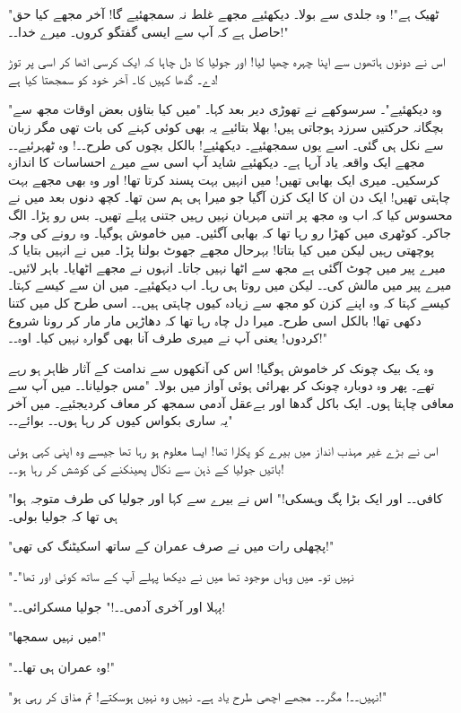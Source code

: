 "ٹھیک ہے"! وہ جلدی سے بولا۔ دیکھئیے مجھے غلط نہ سمجھئیے گا! آخر مجھے کیا حق حاصل ہے کہ آپ سے ایسی گفتگو کروں۔ میرے خدا۔۔!"

اس نے دونوں ہاتھوں سے اپنا چہرہ چھپا لیا! اور جولیا کا دل چاہا کہ ایک کرسی اٹھا کر اسی پر توڑ دے۔ گدھا کہیں کا۔ آخر خود کو سمجھتا کیا ہے!

"وہ دیکھئیے"۔ سرسوکھے نے تھوڑی دیر بعد کہا۔ "میں کیا بتاؤں بعض اوقات مجھ سے بچگانہ حرکتیں سرزد ہوجاتی ہیں! بھلا بتائیے یہ بھی کوئی کہنے کی بات تھی مگر زبان سے نکل ہی گئی۔ اسے یوں سمجھئیے۔ دیکھئیے! بالکل بچوں کی طرح۔۔! وہ ٹھہرئیے۔۔ مجھے ایک واقعہ یاد آرہا ہے۔ دیکھئیے شاید آپ اسی سے میرے احساسات کا اندازہ کرسکیں۔ میری ایک بھابی تھیں! میں انہیں بہت پسند کرتا تھا! اور وہ بھی مجھے بہت چاہتی تھیں! ایک دن ان کا ایک کزن آگیا جو میرا ہی ہم سن تھا۔ کچھ دنوں بعد میں نے محسوس کیا کہ اب وہ مجھ پر اتنی مہربان نہیں رہیں جتنی پہلے تھیں۔ بس رو پڑا۔ الگ جاکر۔ کوٹھری میں کھڑا رو رہا تھا کہ بھابی آگئیں۔ میں خاموش ہوگیا۔ وہ رونے کی وجہ پوچھتی رہیں لیکن میں کیا بتاتا! بہرحال مجھے جھوٹ بولنا پڑا۔ میں نے انہیں بتایا کہ میرے پیر میں چوٹ آگئی ہے مجھ سے اٹھا نہیں جاتا۔ انہوں نے مجھے اٹھایا۔ باہر لائیں۔ میرے پیر میں مالش کی۔۔ لیکن میں روتا ہی رہا۔ اب دیکھئیے۔ میں ان سے کیسے کہتا۔ کیسے کہتا کہ وہ اپنے کزن کو مجھ سے زیادہ کیوں چاہتی ہیں۔۔ اسی طرح کل میں کتنا دکھی تھا! بالکل اسی طرح۔ میرا دل چاہ رہا تھا کہ دھاڑیں مار مار کر رونا شروع کردوں! یعنی آپ نے میری طرف آنا بھی گوارہ نہیں کیا۔ اوہ۔۔!"

وہ یک بیک چونک کر خاموش ہوگیا! اس کی آنکھوں سے ندامت کے آثار ظاہر ہو رہے تھے۔ پھر وہ دوبارہ چونک کر بھرائی ہوئی آواز میں بولا۔ "مس جولیانا۔۔ میں آپ سے معافی چاہتا ہوں۔ ایک باکل گدھا اور بےعقل آدمی سمجھ کر معاف کردیجئیے۔ میں آخر یہ ساری بکواس کیوں کر رہا ہوں۔۔ بوائے۔۔"

اس نے بڑے غیر مہذب انداز میں بیرے کو پکارا تھا! ایسا معلوم ہو رہا تھا جیسے وہ اپنی کہی ہوئی باتیں جولیا کے ذہن سے نکال پھینکنے کی کوشش کر رہا ہو۔۔!

"کافی۔۔ اور ایک بڑا پگ وہسکی!" اس نے بیرے سے کہا اور جولیا کی طرف متوجہ ہوا ہی تھا کہ جولیا بولی۔

"پچھلی رات میں نے صرف عمران کے ساتھ اسکیٹنگ کی تھی!"

"نہیں تو۔ میں وہاں موجود تھا میں نے دیکھا پہلے آپ کے ساتھ کوئی اور تھا"۔

"پہلا اور آخری آدمی۔۔!" جولیا مسکرائی۔۔!

"میں نہیں سمجھا!"

"وہ عمران ہی تھا۔۔!"

"نہیں۔۔! مگر۔۔ مجھے اچھی طرح یاد ہے۔ نہیں وہ نہیں ہوسکتے! تم مذاق کر رہی ہو!"

